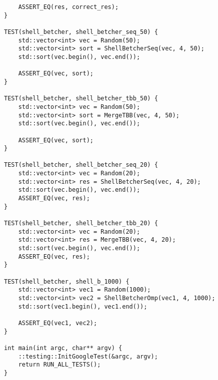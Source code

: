 \documentclass{report}
\begin{document}
\begin{lstlisting}
    ASSERT_EQ(res, correct_res);
}

TEST(shell_betcher, shell_betcher_seq_50) {
    std::vector<int> vec = Random(50);
    std::vector<int> sort = ShellBetcherSeq(vec, 4, 50);
    std::sort(vec.begin(), vec.end());

    ASSERT_EQ(vec, sort);
}

TEST(shell_betcher, shell_betcher_tbb_50) {
    std::vector<int> vec = Random(50);
    std::vector<int> sort = MergeTBB(vec, 4, 50);
    std::sort(vec.begin(), vec.end());

    ASSERT_EQ(vec, sort);
}

TEST(shell_betcher, shell_betcher_seq_20) {
    std::vector<int> vec = Random(20);
    std::vector<int> res = ShellBetcherSeq(vec, 4, 20);
    std::sort(vec.begin(), vec.end());
    ASSERT_EQ(vec, res);
}

TEST(shell_betcher, shell_betcher_tbb_20) {
    std::vector<int> vec = Random(20);
    std::vector<int> res = MergeTBB(vec, 4, 20);
    std::sort(vec.begin(), vec.end());
    ASSERT_EQ(vec, res);
}

TEST(shell_betcher, shell_b_1000) {
    std::vector<int> vec1 = Random(1000);
    std::vector<int> vec2 = ShellBetcherOmp(vec1, 4, 1000);
    std::sort(vec1.begin(), vec1.end());

    ASSERT_EQ(vec1, vec2);
}

int main(int argc, char** argv) {
    ::testing::InitGoogleTest(&argc, argv);
    return RUN_ALL_TESTS();
}

\end{lstlisting}
\end{document}
